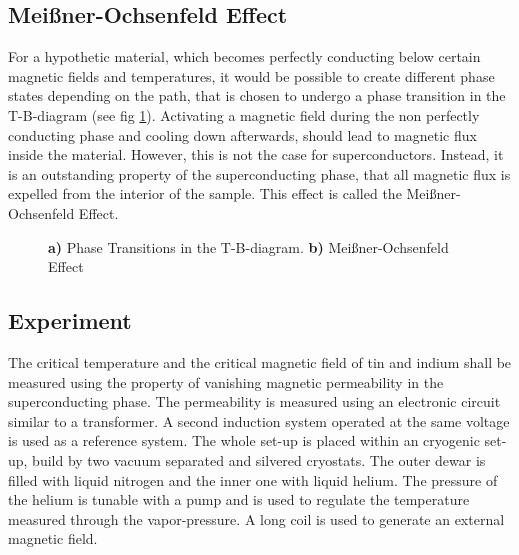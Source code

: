 \documentclass[a4paper]{scrartcl}
\numberwithin{equation}{section}
\numberwithin{figure}{section}
\numberwithin{table}{section}
\begin{document}
\subsection*{Meißner-Ochsenfeld Effect}
For a hypothetic material, which becomes perfectly conducting below certain magnetic fields and temperatures, it would be possible to create different phase states depending on the path, that is chosen to undergo a phase transition in the T-B-diagram (see fig \ref{fig:tb}). Activating a magnetic field during the non perfectly conducting phase and cooling down afterwards, should lead to magnetic flux inside the material. However, this is not the case for superconductors. Instead, it is an outstanding property of the superconducting phase, that all magnetic flux is expelled from the interior of the sample. This effect is called the Meißner-Ochsenfeld Effect.

\begin{figure}
\caption{\small \textbf{a)} Phase Transitions in the T-B-diagram. \textbf{b)} Meißner-Ochsenfeld Effect}
\label{fig:tb}
\end{figure}

\subsection*{Experiment} 
The critical temperature and the critical magnetic field of tin and indium shall be measured using the property of vanishing magnetic permeability in the superconducting phase. The permeability is measured using an electronic circuit similar to a transformer. A second induction system operated at the same voltage is used as a reference system. The whole set-up is placed within an cryogenic set-up, build by two vacuum separated and silvered cryostats. The outer dewar is filled with liquid nitrogen and the inner one with liquid helium. The pressure of the helium is tunable with a pump and is used to regulate the temperature measured through the vapor-pressure. A long coil is used to generate an external magnetic field.

\nocite{buckel}
\nocite{tinkham}
\nocite{BCS}
\nocite{GL}
\nocite{hofmann}


\end{document}
